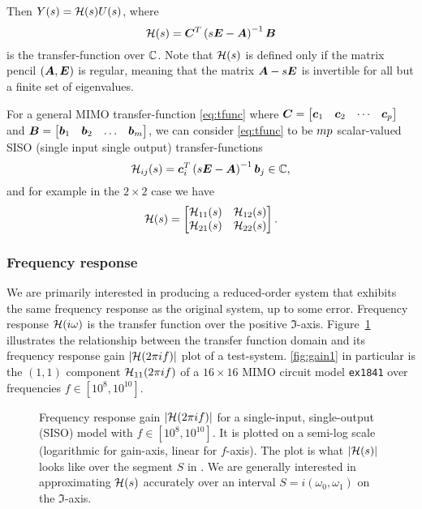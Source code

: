         Then $Y(s)=\mathcal{H}(s) U(s)$, where 
        \begin{equation}
                \mathcal{H}(s) = \bm{C}^T\left(s\bm{E}-\bm{A}\right)^{-1}\bm{B} 
                \label{eq:tfunc}
        \end{equation}
        is the transfer-function over $\mathbb{C}$.
Note that $\mathcal{H}(s)$
        is defined only if the matrix pencil $(\bm{A},\bm{E})$ is regular, meaning that the matrix $\bm{A}-s \bm{E}$ is invertible for all but a finite set of eigenvalues.  

For a general MIMO transfer-function \eqref{eq:tfunc} where $\bm{C}=\begin{bmatrix} \bm{c}_1 & \bm{c}_2 & \cdots  &\bm{c}_p\end{bmatrix}$ and 
$\bm{B}=\begin{bmatrix} \bm{b}_1& \bm{b}_2&\ldots&\bm{b}_m\end{bmatrix}$, we can consider \eqref{eq:tfunc} to be $m p$ scalar-valued SISO (single input single output) transfer-functions 
\[
\mathcal{H}_{ij}(s) = \bm{c}_i^T \left(s\bm{E}-\bm{A}\right)^{-1} \bm{b}_j \in \mathbb{C}, 
\]
and for example in the $2\times 2$ case we have 
\[
\mathcal{H}(s) = \begin{bmatrix} \mathcal{H}_{11}(s) & \mathcal{H}_{12}(s) \\ \mathcal{H}_{21}(s) & \mathcal{H}_{22}(s)\end{bmatrix}.
\]

\subsubsection{Frequency response}
We are primarily interested in producing a reduced-order system that exhibits the same frequency response as the original system, up to some error.  Frequency response $\mathcal{H}(i \omega)$   is the transfer function over the positive $\Im$-axis. 
Figure~\ref{fig:ex1b_tfunc} illustrates the relationship between the transfer function domain and its frequency response gain $\vert \mathcal{H}(2\pi i f) \vert$ plot of a test-system.  \ref{fig:gain1} in particular is the $(1,1)$ component $\mathcal{H}_{11}(2\pi i f)$ of a $16\times 16$ MIMO circuit model \texttt{ex1841} over  frequencies $f\in \left[10^8,10^{10}\right]$.
 \begin{figure}[htbp]
                \centering
              \hfill       
                \caption{Frequency response gain $\vert \mathcal{H}(2\pi i f) \vert$ for a 
                single-input, single-output (SISO) model with $f\in \left[10^8,10^{10}\right]$.  It is plotted on a semi-log scale (logarithmic for gain-axis, linear for $f$-axis).  The plot  is what $\vert \mathcal{H}(s) \vert$  looks like over the segment $S$ in . We are generally interested in approximating $\mathcal{H}(s)$ accurately over an interval 
$S=i(\omega_0, \omega_1)$ on the $\Im$-axis.}
                \label{fig:ex1b_tfunc}
 \end{figure}


